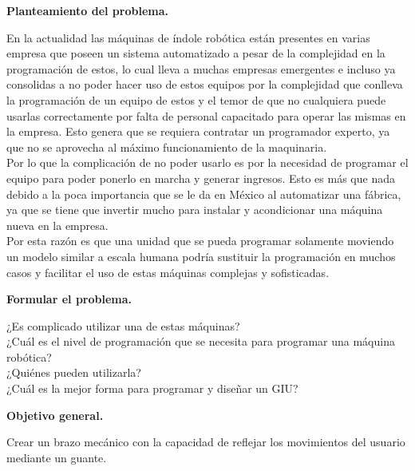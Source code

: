 \documentclass[letterpaper]{article}
\begin{document}
\begin{large}
    \begin{LARGE}
        \textbf{Planteamiento del problema.}\\
    \end{LARGE}%
    \begin{large}
    En la actualidad las máquinas de índole robótica están presentes en varias empresa que poseen un sistema automatizado a pesar de la complejidad en la programación de estos, lo cual lleva a muchas empresas emergentes e incluso ya consolidas a no poder hacer uso de estos equipos por la complejidad que conlleva la programación de un equipo de estos y el temor de que no cualquiera puede usarlas correctamente por falta de personal capacitado para operar las mismas en la empresa. Esto genera que se requiera contratar un programador experto, ya que no se aprovecha al máximo funcionamiento de la maquinaria.\\
    Por lo que la complicación de no poder usarlo es por la necesidad de programar el equipo para poder ponerlo en marcha y generar ingresos. Esto es más que nada debido a la poca importancia que se le da en México al automatizar una fábrica, ya que se tiene que invertir mucho para instalar y acondicionar una máquina nueva en la empresa.\\
    Por esta razón es que una unidad que se pueda programar solamente moviendo un modelo similar a escala humana podría sustituir la programación en muchos casos y facilitar el uso de estas máquinas complejas y sofisticadas.\\
    \end{large}
\end{large}

\begin{large}
    \begin{LARGE}
       \textbf{Formular el problema.}\\
    \end{LARGE}
    ¿Es complicado utilizar una de estas máquinas?\\
    ¿Cuál es el nivel de programación que se necesita para programar una máquina robótica?\\
    ¿Quiénes pueden utilizarla?\\
    ¿Cuál es la mejor forma para programar y diseñar un GIU?\\
    
\end{large}

\begin{large}
    \begin{LARGE}
        \textbf{Objetivo general.}\\
    \end{LARGE}
     Crear un brazo mecánico con la capacidad de reflejar los movimientos del usuario mediante un guante. 
  
\end{large}
\end{document}
